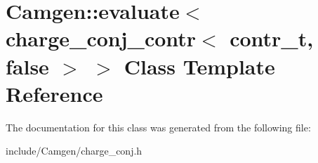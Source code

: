 \hypertarget{a00142}{\section{Camgen\-:\-:evaluate$<$ charge\-\_\-conj\-\_\-contr$<$ contr\-\_\-t, false $>$ $>$ Class Template Reference}
\label{a00142}
}


The documentation for this class was generated from the following file\-:\begin{DoxyCompactItemize}
\item 
include/\-Camgen/charge\-\_\-conj.\-h\end{DoxyCompactItemize}
